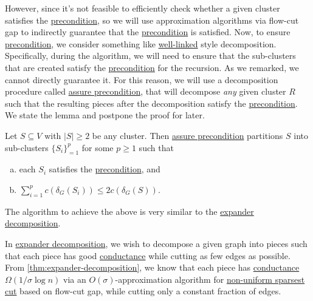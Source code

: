 However, since it's not feasible to efficiently check whether a given cluster satisfies the \hyperref[def:precondition]{precondition}, so we will use approximation algorithms via flow-cut gap to indirectly guarantee that the \hyperref[def:precondition]{precondition} is satisfied. Now, to ensure \hyperref[def:precondition]{precondition}, we consider something like \hyperref[def:well-linked]{well-linked} style decomposition. Specifically, during the algorithm, we will need to ensure that the sub-clusters that are created satisfy the \hyperref[def:precondition]{precondition} for the recursion. As we remarked, we cannot directly guarantee it. For this reason, we will use a decomposition procedure called \hyperref[algo:assure-precondition]{assure precondition}, that will decompose \emph{any} given cluster \(R\) such that the resulting pieces after the decomposition satisfy the \hyperref[def:precondition]{precondition}. We state the lemma and postpone the proof for later.

\begin{lemma}\label{lma:assure-precondition}
	Let \(S \subseteq V\) with \(\lvert S \rvert \geq 2\) be any cluster. Then \hyperref[algo:assure-precondition]{assure precondition} partitions \(S\) into sub-clusters \(\{S_i\}_{=1}^{p}\) for some \(p \geq 1\) such that
	\begin{enumerate}[(a)]
		\item each \(S_i\) satisfies the \hyperref[def:precondition]{precondition}, and
		\item \(\sum_{i=1}^{p} c(\delta _G(S_i)) \leq 2c(\delta _G(S))\).
	\end{enumerate}
\end{lemma}

The algorithm to achieve the above is very similar to the \hyperref[algo:expander-decomposition]{expander decomposition}.

\begin{prev}
	In \hyperref[algo:expander-decomposition]{expander decomposition}, we wish to decompose a given graph into pieces such that each piece has good \hyperref[def:conductance]{conductance} while cutting as few edges as possible. From \autoref{thm:expander-decomposition}, we know that each piece has \hyperref[def:conductance]{conductance} \(\Omega (1 / \sigma \log n)\) via an \(O(\sigma )\)-approximation algorithm for \hyperref[prb:non-uniform-sparsest-cut]{non-uniform sparsest cut} based on flow-cut gap, while cutting only a constant fraction of edges.
\end{prev}

